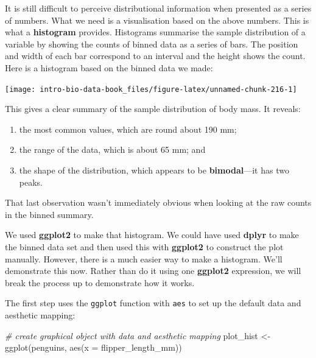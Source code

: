 \documentclass[
]{book}
\newenvironment{Shaded}{\begin{snugshade}}{\end{snugshade}}
\newcommand{\AttributeTok}[1]{\textcolor[rgb]{0.77,0.63,0.00}{#1}}
\newcommand{\CommentTok}[1]{\textcolor[rgb]{0.56,0.35,0.01}{\textit{#1}}}
\newcommand{\FunctionTok}[1]{\textcolor[rgb]{0.00,0.00,0.00}{#1}}
\newcommand{\NormalTok}[1]{#1}
\newcommand{\OtherTok}[1]{\textcolor[rgb]{0.56,0.35,0.01}{#1}}
\providecommand{\tightlist}{%
  \setlength{\itemsep}{0pt}\setlength{\parskip}{0pt}}
\begin{document}
It is still difficult to perceive distributional information when presented as a series of numbers. What we need is a visualisation based on the above numbers. This is what a \textbf{histogram} provides. Histograms summarise the sample distribution of a variable by showing the counts of binned data as a series of bars. The position and width of each bar correspond to an interval and the height shows the count. Here is a histogram based on the binned data we made:

\begin{center}\texttt{[image: intro-bio-data-book\_files/figure-latex/unnamed-chunk-216-1]} \end{center}

This gives a clear summary of the sample distribution of body mass. It reveals:

\begin{enumerate}
\def\labelenumi{\arabic{enumi}.}
\tightlist
\item
  the most common values, which are round about 190 mm;
\item
  the range of the data, which is about 65 mm; and
\item
  the shape of the distribution, which appears to be \textbf{bimodal}---it has two peaks.
\end{enumerate}

That last observation wasn't immediately obvious when looking at the raw counts in the binned summary.

We used \textbf{ggplot2} to make that histogram. We could have used \textbf{dplyr} to make the binned data set and then used this with \textbf{ggplot2} to construct the plot manually. However, there is a much easier way to make a histogram. We'll demonstrate this now. Rather than do it using one \textbf{ggplot2} expression, we will break the process up to demonstrate how it works.

The first step uses the \texttt{ggplot} function with \texttt{aes} to set up the default data and aesthetic mapping:

\begin{Shaded}
\begin{Highlighting}[]
\CommentTok{\# create graphical object with data and aesthetic mapping}
\NormalTok{plot\_hist }\OtherTok{\textless{}{-}} \FunctionTok{ggplot}\NormalTok{(penguins, }\FunctionTok{aes}\NormalTok{(}\AttributeTok{x =}\NormalTok{ flipper\_length\_mm))}
\end{Highlighting}
\end{Shaded}
\end{document}
